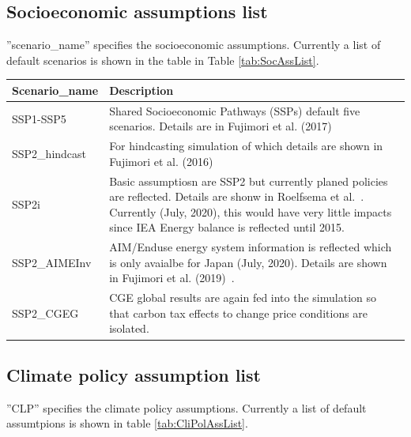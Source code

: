 \documentclass[10pt,a4paper,titlepage,dvipdfmx]{book}
\begin{document}
\subsection{\label{subsec:SocAssLis}Socioeconomic assumptions list}

''scenario\_name'' specifies the socioeconomic assumptions. Currently a list of default scenarios is shown in the table in Table \ref{tab:SocAssList}.


\begin{tabularx}{\textwidth}{|
p{}|
p{}|} 
\caption{\label{tab:SocAssList} Socioeconomic assumptions list} \\
\hline 
Scenario\_name & Description \\\hline 
SSP1-SSP5 & Shared Socioeconomic Pathways (SSPs) default five scenarios. Details are in Fujimori et al. (2017)~\cite{RN4363} \\\hline 
SSP2\_hindcast & For hindcasting simulation of which details are shown in Fujimori et al. (2016)~\cite{RN4011} \\\hline 
SSP2i & Basic assumptiosn are SSP2 but currently planed policies are reflected. Details are shonw in Roelfsema et al.~\cite{RN4407}. Currently (July, 2020), this would have very little impacts since IEA Energy balance is reflected until 2015.  \\\hline 
SSP2\_AIMEInv & AIM/Enduse energy system information is reflected which is only avaialbe for Japan (July, 2020). Details are shown in Fujimori et al. (2019)~\cite{RN4425}. \\\hline 
SSP2\_CGEG & CGE global results are again fed into the simulation so that carbon tax effects to change price conditions are isolated. \\\hline 
\end{tabularx}
\subsection{\label{subsec:CliPolAssLis}Climate policy assumption list}

''CLP'' specifies the climate policy assumptions. Currently a list of default assumtpions is shown in table \ref{tab:CliPolAssList}.
\end{document}
